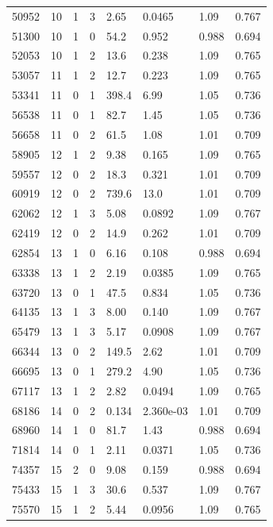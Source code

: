 \documentclass[preview]{standalone}
\begin{document}
{{{\begin{tabular}{L{1.2cm}C{1.2cm} C{0.3cm}C{0.5cm} C{1.4cm}C{1.4cm} C{1.4cm}C{1.4cm}}
  50952  &    10  & 1     &  3 &  2.65  & 0.0465  & 1.09 &  0.767   \\ 
  51300  &    10  & 1     &  0 &  54.2  & 0.952  & 0.988 &  0.694   \\ 
  52053  &    10  & 1     &  2 &  13.6  & 0.238  & 1.09 &  0.765   \\ 
  53057  &    11  & 1     &  2 &  12.7  & 0.223  & 1.09 &  0.765   \\ 
  53341  &    11  & 0     &  1 &  398.4  & 6.99  & 1.05 &  0.736   \\ 
  56538  &    11  & 0     &  1 &  82.7  & 1.45  & 1.05 &  0.736   \\ 
  56658  &    11  & 0     &  2 &  61.5  & 1.08  & 1.01 &  0.709   \\ 
  58905  &    12  & 1     &  2 &  9.38  & 0.165  & 1.09 &  0.765   \\ 
  59557  &    12  & 0     &  2 &  18.3  & 0.321  & 1.01 &  0.709   \\ 
  60919  &    12  & 0     &  2 &  739.6  & 13.0  & 1.01 &  0.709   \\ 
  62062  &    12  & 1     &  3 &  5.08  & 0.0892  & 1.09 &  0.767   \\ 
  62419  &    12  & 0     &  2 &  14.9  & 0.262  & 1.01 &  0.709   \\ 
  62854  &    13  & 1     &  0 &  6.16  & 0.108  & 0.988 &  0.694   \\ 
  63338  &    13  & 1     &  2 &  2.19  & 0.0385  & 1.09 &  0.765   \\ 
  63720  &    13  & 0     &  1 &  47.5  & 0.834  & 1.05 &  0.736   \\ 
  64135  &    13  & 1     &  3 &  8.00  & 0.140  & 1.09 &  0.767   \\ 
  65479  &    13  & 1     &  3 &  5.17  & 0.0908  & 1.09 &  0.767   \\ 
  66344  &    13  & 0     &  2 &  149.5  & 2.62  & 1.01 &  0.709   \\ 
  66695  &    13  & 0     &  1 &  279.2  & 4.90  & 1.05 &  0.736   \\ 
  67117  &    13  & 1     &  2 &  2.82  & 0.0494  & 1.09 &  0.765   \\ 
  68186  &    14  & 0     &  2 &  0.134  & 2.360e-03  & 1.01 &  0.709   \\ 
  68960  &    14  & 1     &  0 &  81.7  & 1.43  & 0.988 &  0.694   \\ 
  71814  &    14  & 0     &  1 &  2.11  & 0.0371  & 1.05 &  0.736   \\ 
  74357  &    15  & 2     &  0 &  9.08  & 0.159  & 0.988 &  0.694   \\ 
  75433  &    15  & 1     &  3 &  30.6  & 0.537  & 1.09 &  0.767   \\ 
  75570  &    15  & 1     &  2 &  5.44  & 0.0956  & 1.09 &  0.765   \\ 
\hline 
\end{tabular} 

}}}
\end{document}
